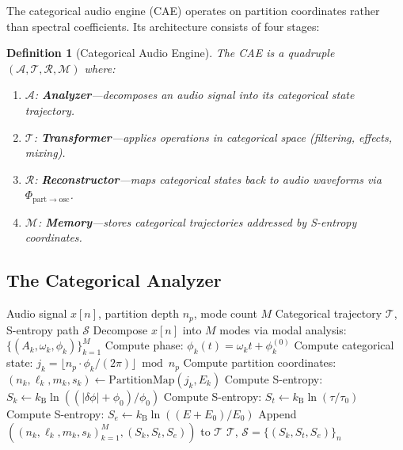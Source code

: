 \documentclass[twocolumn,10pt]{article}
\newtheorem{definition}[theorem]{Definition}
\theoremstyle{remark}
\newcommand{\kB}{k_{\mathrm{B}}}
\newcommand{\Sk}{S_k}
\newcommand{\St}{S_t}
\newcommand{\Se}{S_e}
\newcommand{\calS}{\mathcal{S}}
\newcommand{\calA}{\mathcal{A}}
\newcommand{\calT}{\mathcal{T}}
\newcommand{\calR}{\mathcal{R}}
\newcommand{\calM}{\mathcal{M}}
\begin{document}
The categorical audio engine (CAE) operates on partition coordinates rather than spectral coefficients. Its architecture consists of four stages:

\begin{definition}[Categorical Audio Engine]
\label{def:cae}
The CAE is a quadruple $(\calA, \calT, \calR, \calM)$ where:
\begin{enumerate}
    \item $\calA$: \textbf{Analyzer}---decomposes an audio signal into its categorical state trajectory.
    \item $\calT$: \textbf{Transformer}---applies operations in categorical space (filtering, effects, mixing).
    \item $\calR$: \textbf{Reconstructor}---maps categorical states back to audio waveforms via $\Phi_{\mathrm{part} \to \mathrm{osc}}$.
    \item $\calM$: \textbf{Memory}---stores categorical trajectories addressed by S-entropy coordinates.
\end{enumerate}
\end{definition}

\subsection{The Categorical Analyzer}

\begin{algorithm}
\caption{Categorical Audio Analysis}
\label{alg:analysis}
\begin{algorithmic}[1]
\Require Audio signal $x[n]$, partition depth $n_p$, mode count $M$
\Ensure Categorical trajectory $\calT$, S-entropy path $\calS$
\State Decompose $x[n]$ into $M$ modes via modal analysis: $\{(A_k, \omega_k, \phi_k)\}_{k=1}^M$
        \State Compute phase: $\phi_k(t) = \omega_k t + \phi_k^{(0)}$
        \State Compute categorical state: $j_k = \lfloor n_p \cdot \phi_k / (2\pi) \rfloor \bmod n_p$
        \State Compute partition coordinates: $(n_k, \ell_k, m_k, s_k) \gets \mathrm{PartitionMap}(j_k, E_k)$
    \EndFor
    \State Compute S-entropy: $\Sk \gets \kB \ln((|\delta\phi| + \phi_0)/\phi_0)$
    \State Compute S-entropy: $\St \gets \kB \ln(\tau/\tau_0)$
    \State Compute S-entropy: $\Se \gets \kB \ln((E + E_0)/E_0)$
    \State Append $((n_k, \ell_k, m_k, s_k)_{k=1}^M, (\Sk, \St, \Se))$ to $\calT$
\EndFor
\State \Return $\calT$, $\calS = \{(\Sk, \St, \Se)\}_n$
\end{algorithmic}
\end{algorithm}
\end{document}
